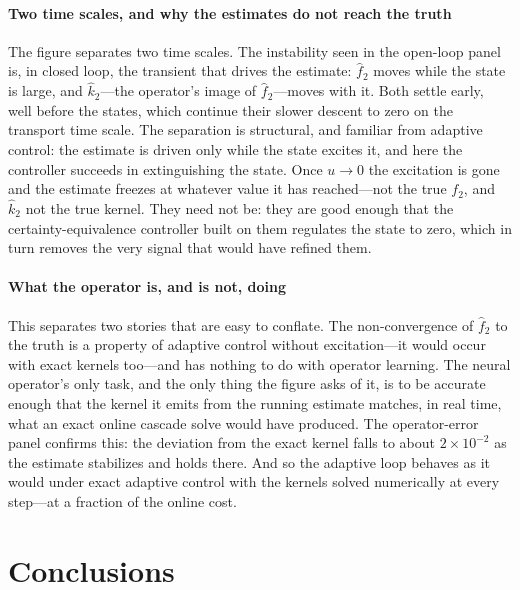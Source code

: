 \documentclass[journal,twoside,web]{ieeecolor}
\begin{document}
\paragraph*{Two time scales, and why the estimates do not reach the truth} The figure separates two time scales. The instability seen in the open-loop panel is, in closed loop, the transient that drives the estimate: $\hat f_2$ moves while the state is large, and $\hat k_2$---the operator's image of $\hat f_2$---moves with it. Both settle early, well before the states, which continue their slower descent to zero on the transport time scale. The separation is structural, and familiar from adaptive control: the estimate is driven only while the state excites it, and here the controller succeeds in extinguishing the state. Once $u\to0$ the excitation is gone and the estimate freezes at whatever value it has reached---not the true $f_2$, and $\hat k_2$ not the true kernel. They need not be: they are good enough that the certainty-equivalence controller built on them regulates the state to zero, which in turn removes the very signal that would have refined them.

\paragraph*{What the operator is, and is not, doing} This separates two stories that are easy to conflate. The non-convergence of $\hat f_2$ to the truth is a property of adaptive control without excitation---it would occur with exact kernels too---and has nothing to do with operator learning. The neural operator's only task, and the only thing the figure asks of it, is to be accurate enough that the kernel it emits from the running estimate matches, in real time, what an exact online cascade solve would have produced. The operator-error panel confirms this: the deviation from the exact kernel falls to about $2\times10^{-2}$ as the estimate stabilizes and holds there. And so the adaptive loop behaves as it would under exact adaptive control with the kernels solved numerically at every step---at a fraction of the online cost.

\section{Conclusions}\label{sec:conclusions}
\end{document}
